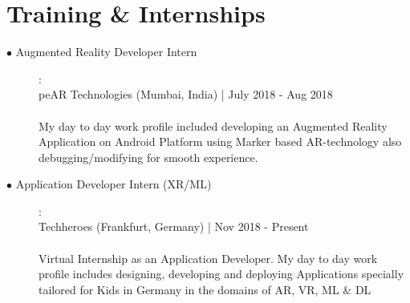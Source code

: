 \documentclass[11pt]{article}
\begin{document}
\section{Training \& Internships}
\begin{description}
    \item[$\bullet$ Augmented Reality Developer Intern]:
    \\peAR Technologies (Mumbai, India) | July 2018 - Aug 2018
    \\\\My day to day work profile included developing an Augmented Reality Application on Android Platform using Marker based AR-technology also debugging/modifying for smooth experience.

    \item[$\bullet$ Application Developer Intern (XR/ML)]:
    \\Techheroes (Frankfurt, Germany) | Nov 2018 - Present
    \\\\Virtual Internship as an Application Developer. My day to day work profile includes designing, developing and deploying Applications specially tailored for Kids in Germany in the domains of AR, VR, ML \& DL

\end{description}
\end{document}
